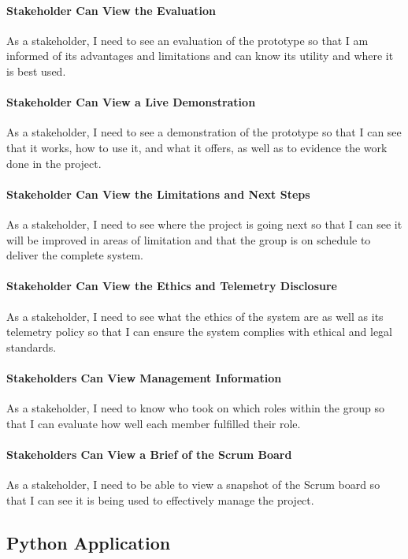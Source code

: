 \paragraph{Stakeholder Can View the Evaluation}
As a stakeholder, I need to see an evaluation of the prototype so that I am informed of its advantages and limitations and can know its utility and where it is best used.

\paragraph{Stakeholder Can View a Live Demonstration}
As a stakeholder, I need to see a demonstration of the prototype so that I can see that it works, how to use it, and what it offers, as well as to evidence the work done in the project.

\paragraph{Stakeholder Can View the Limitations and Next Steps}
As a stakeholder, I need to see where the project is going next so that I can see it will be improved in areas of limitation and that the group is on schedule to deliver the complete system.

\paragraph{Stakeholder Can View the Ethics and Telemetry Disclosure}
As a stakeholder, I need to see what the ethics of the system are as well as its telemetry policy so that I can ensure the system complies with ethical and legal standards.

\paragraph{Stakeholders Can View Management Information}
As a stakeholder, I need to know who took on which roles within the group so that I can evaluate how well each member fulfilled their role.

\paragraph{Stakeholders Can View a Brief of the Scrum Board}
As a stakeholder, I need to be able to view a snapshot of the Scrum board so that I can see it is being used to effectively manage the project.

\subsection{Python Application}

